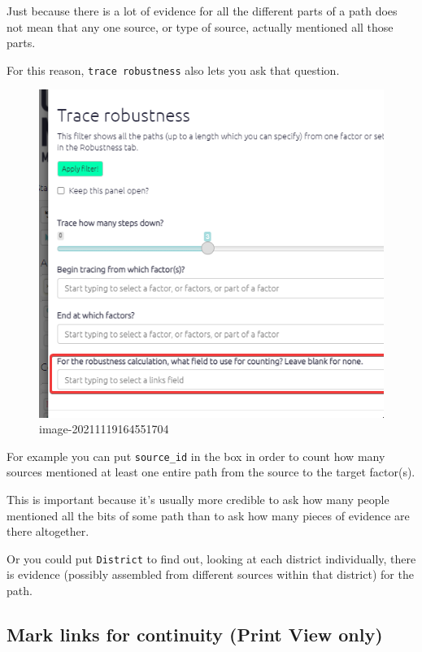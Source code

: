 \documentclass[
]{book}
\begin{document}
Just because there is a lot of evidence for all the different parts of a path does not mean that any one source, or type of source, actually mentioned all those parts.

For this reason, \texttt{trace\ robustness} also lets you ask that question.

\begin{figure}
\centering
\includegraphics{_assets/image-20211119164551704.png}
\caption{image-20211119164551704}
\end{figure}

For example you can put \texttt{source\_id} in the box in order to count how many sources mentioned at least one entire path from the source to the target factor(s).

This is important because it's usually more credible to ask how many people mentioned all the bits of some path than to ask how many pieces of evidence are there altogether.

Or you could put \texttt{District} to find out, looking at each district individually, there is evidence (possibly assembled from different sources within that district) for the path.

\hypertarget{mark-links-for-continuity-print-view-only}{%
\subsection{Mark links for continuity (Print View only)}\label{mark-links-for-continuity-print-view-only}}
\end{document}
